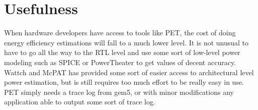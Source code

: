 \section{Usefulness}
When hardware developers have access to tools like PET, the cost of doing energy efficiency estimations will fall
to a much lower level. It is not unusual to have to go all the way to the RTL level and use some sort of
low-level power modeling such as SPICE \cite{ponomarev2002accupower} or PowerTheater \cite{bruno2005rtl} to
get values of decent accuracy. Wattch and McPAT has provided some sort of easier access to architectural level
power estimation, but is still requires too much effort to be really easy in use. PET simply needs a trace log
from gem5, or with minor modifications any application able to output some sort of trace log.

